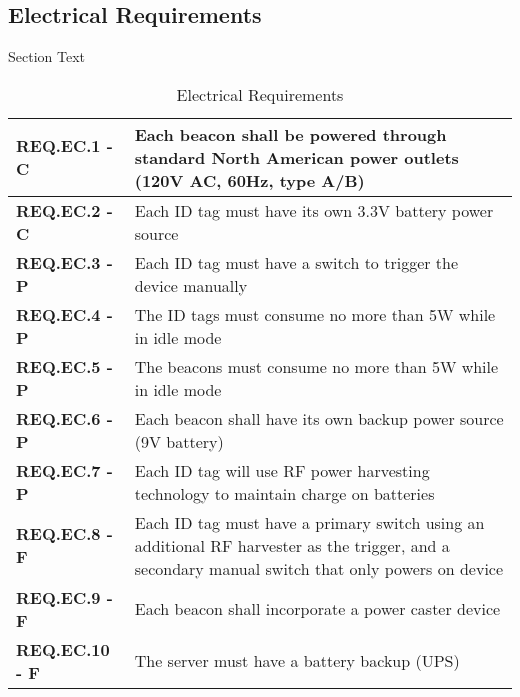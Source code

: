 \documentclass[11pt]{article}
\begin{document}
\break
\subsection{Electrical Requirements}
Section Text
\bgroup
\def\arraystretch{1.5}
\begin{table}[H]
\centering
\begin{tabular}{ | m{3.5cm} | m{12.5cm} | } 
 \hline
 \textbf{ REQ.EC.1 - C } & Each beacon shall be powered through standard North American power outlets (120V AC, 60Hz, type A/B) \\ 
\hline
 \textbf{ REQ.EC.2 - C } & Each ID tag must have its own 3.3V battery power source \\ 
\hline
 \textbf{ REQ.EC.3 - P } & Each ID tag must have a switch to trigger the device manually \\ 
\hline
 \textbf{ REQ.EC.4 - P} & The ID tags must consume no more than 5W while in idle mode \\
\hline
 \textbf{ REQ.EC.5 - P } & The beacons must consume no more than 5W while in idle mode\\
\hline
 \textbf{ REQ.EC.6 - P } & Each beacon shall have its own backup power source (9V battery)  \\
\hline
 \textbf{ REQ.EC.7 - P } & Each ID tag will use RF power harvesting technology to maintain charge on batteries \\
\hline
 \textbf{ REQ.EC.8 - F } & Each ID tag must have a primary switch using an additional RF harvester as the trigger, and a secondary manual switch that only powers on device  \\
\hline
 \textbf{ REQ.EC.9 - F } & Each beacon shall incorporate a power caster device \\
\hline
 \textbf{ REQ.EC.10 - F } & The server must have a battery backup (UPS) \\
\hline
\end{tabular}
\caption{Electrical Requirements}
\end{table}	

\break
\end{document}
